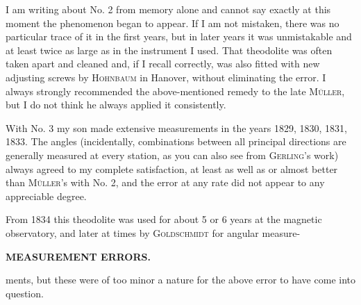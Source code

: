 \par\noindent\hspace*{\parindent}I am writing about No. 2 from memory alone and cannot say exactly at this moment  the phenomenon began to appear. If I am not mistaken, there was no particular trace of it in the first years, but in later years it was unmistakable and at least twice as large as in the instrument I used. That theodolite was often taken apart and cleaned and, if I recall correctly, was also fitted with new adjusting screws by \textsc{Hohnbaum} in Hanover, without eliminating the error. I always strongly recommended the above-mentioned remedy to the late \textsc{Müller}, but I do not think he always applied it consistently.

\par\noindent\hspace*{\parindent}With No. 3 my son made  extensive measurements in the years 1829, 1830, 1831, 1833. The angles (incidentally,  combinations between all principal directions are generally measured at every station, as you can also see from \textsc{Gerling}'s work) always agreed to my complete satisfaction, at least as well as or almost better than \textsc{Müller}'s with No. 2, and the error at any rate did not appear to any appreciable degree.

\par\noindent\hspace*{\parindent}From 1834 this theodolite was used for about 5 or 6 years at the magnetic observatory, and later at times by \textsc{Goldschmidt} for angular measure-

\par\clearpage
\noindent\null\hfill{\small\textbf{MEASUREMENT ERRORS.}}\hfill{}\par\medskip
\noindent ments, but these were of too minor a nature for the above error to have come into question.

